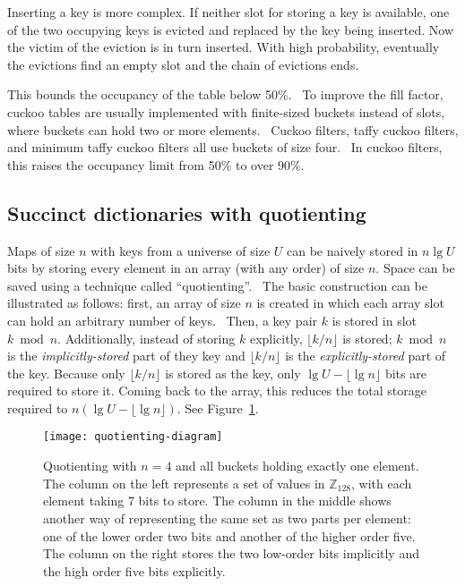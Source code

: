 \documentclass[sigconf]{acmart}
\newcommand{\ints}{\mathbb{Z}}
\begin{document}
Inserting a key is more complex.
If neither slot for storing a key is available, one of the two occupying keys is evicted and replaced by the key being inserted.
Now the victim of the eviction is in turn inserted.
With high probability, eventually the evictions find an empty slot and the chain of evictions ends.

This bounds the occupancy of the table below 50\%.~\cite{cuckoo-journal}
To improve the fill factor, cuckoo tables are usually implemented with finite-sized buckets instead of slots, where buckets can hold two or more elements.~\cite{buckets}
Cuckoo filters, taffy cuckoo filters, and minimum taffy cuckoo filters all use buckets of size four.~\cite{cuckoo}
In cuckoo filters, this raises the occupancy limit from 50\% to over 90\%.~\cite{load-thresholds}

\subsection{Succinct dictionaries with quotienting}
\label{quotienting}

Maps of size $n$ with keys from a universe of size $U$ can be naively stored in $n \lg U$ bits by storing every element in an array (with any order) of size $n$.
Space can be saved using a technique called ``quotienting''.~\cite{knuth,quotient-filter}
The basic construction can be illustrated as follows:
first, an array of size $n$ is created in which each array slot can hold an arbitrary number of keys.~\cite{raman-practical}
Then, a key pair $k$ is stored in slot $k \bmod n$.
Additionally, instead of storing $k$ explicitly, $\lfloor k / n \rfloor$ is stored;
$k \bmod n$ is the {\em implicitly-stored} part of they key and $\lfloor k / n \rfloor$ is the {\em explicitly-stored} part of the key.
Because only $\lfloor k / n \rfloor$ is stored as the key, only $\lg U - \lfloor \lg n \rfloor$ bits are required to store it.
Coming back to the array, this reduces the total storage required to $n (\lg U - \lfloor \lg n \rfloor)$.
See Figure~\ref{quotienting-figure}.

\begin{figure}
\texttt{[image: quotienting-diagram]}
\caption{\label{quotienting-figure}
Quotienting with $n=4$ and all buckets holding exactly one element.
The column on the left represents a set of values in $\ints_{128}$, with each element taking 7 bits to store.
The column in the middle shows another way of representing the same set as two parts per element: one of the lower order two bits and another of the higher order five.
The column on the right stores the two low-order bits implicitly and the high order five bits explicitly.
}
\end{figure}
\end{document}

